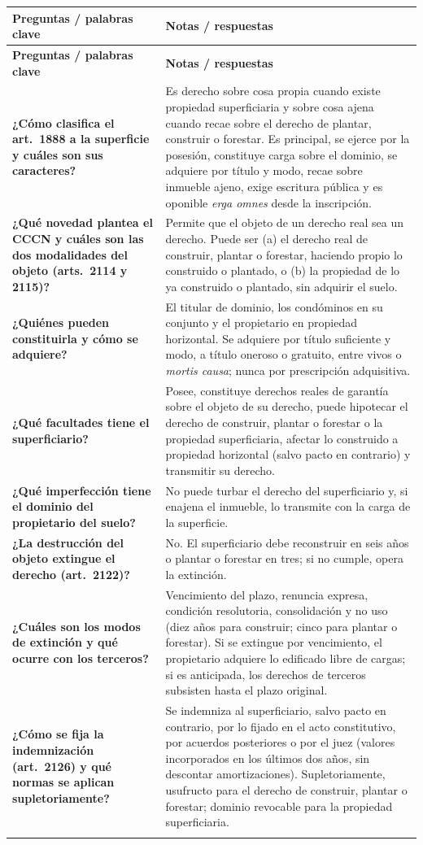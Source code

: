\documentclass[12pt,oneside]{book}
\makeatletter
\renewcommand{\arraystretch}{1.25}
\newcommand{\cq}[2]{\textbf{#1} & #2 \\[0.45em]}
\newcommand{\cornell}[3]{%
\par\bigskip\noindent{\large\bfseries Cuadro Cornell: #1}\par\nopagebreak\smallskip
\begingroup
\small
\renewcommand{\arraystretch}{1.15}
\begin{longtable}{@{}>{\raggedright\arraybackslash}p{0.26\textwidth}>{\raggedright\arraybackslash}p{0.66\textwidth}@{}}
\toprule
\textbf{Preguntas / palabras clave} & \textbf{Notas / respuestas} \\
\midrule
\endfirsthead
\toprule
\textbf{Preguntas / palabras clave} & \textbf{Notas / respuestas} \\
\midrule
\endhead
#2
\midrule
\multicolumn{2}{@{}p{\dimexpr0.92\textwidth+2\tabcolsep\relax}@{}}{\vspace{0.2em}\textbf{Resumen.} #3\vspace{0.2em}} \\
\bottomrule
\end{longtable}
\endgroup
}
\makeatother
\begin{document}
\cornell{superficie}{
\cq{¿Cómo clasifica el art.~1888 a la superficie y cuáles son sus caracteres?}{Es derecho sobre cosa propia cuando existe propiedad superficiaria y sobre cosa ajena cuando recae sobre el derecho de plantar, construir o forestar. Es principal, se ejerce por la posesión, constituye carga sobre el dominio, se adquiere por título y modo, recae sobre inmueble ajeno, exige escritura pública y es oponible \textit{erga omnes} desde la inscripción.}
\cq{¿Qué novedad plantea el CCCN y cuáles son las dos modalidades del objeto (arts.~2114 y 2115)?}{Permite que el objeto de un derecho real sea un derecho. Puede ser (a) el derecho real de construir, plantar o forestar, haciendo propio lo construido o plantado, o (b) la propiedad de lo ya construido o plantado, sin adquirir el suelo.}
\cq{¿Quiénes pueden constituirla y cómo se adquiere?}{El titular de dominio, los condóminos en su conjunto y el propietario en propiedad horizontal. Se adquiere por título suficiente y modo, a título oneroso o gratuito, entre vivos o \textit{mortis causa}; nunca por prescripción adquisitiva.}
\cq{¿Qué facultades tiene el superficiario?}{Posee, constituye derechos reales de garantía sobre el objeto de su derecho, puede hipotecar el derecho de construir, plantar o forestar o la propiedad superficiaria, afectar lo construido a propiedad horizontal (salvo pacto en contrario) y transmitir su derecho.}
\cq{¿Qué imperfección tiene el dominio del propietario del suelo?}{No puede turbar el derecho del superficiario y, si enajena el inmueble, lo transmite con la carga de la superficie.}
\cq{¿La destrucción del objeto extingue el derecho (art.~2122)?}{No. El superficiario debe reconstruir en seis años o plantar o forestar en tres; si no cumple, opera la extinción.}
\cq{¿Cuáles son los modos de extinción y qué ocurre con los terceros?}{Vencimiento del plazo, renuncia expresa, condición resolutoria, consolidación y no uso (diez años para construir; cinco para plantar o forestar). Si se extingue por vencimiento, el propietario adquiere lo edificado libre de cargas; si es anticipada, los derechos de terceros subsisten hasta el plazo original.}
\cq{¿Cómo se fija la indemnización (art.~2126) y qué normas se aplican supletoriamente?}{Se indemniza al superficiario, salvo pacto en contrario, por lo fijado en el acto constitutivo, por acuerdos posteriores o por el juez (valores incorporados en los últimos dos años, sin descontar amortizaciones). Supletoriamente, usufructo para el derecho de construir, plantar o forestar; dominio revocable para la propiedad superficiaria.}
}{La superficie, regulada en los arts.~2114 a 2126, separa la propiedad del suelo de la de lo construido, plantado o forestado. Admite dos modalidades según su objeto y se adquiere por título y modo, nunca por prescripción, con escritura pública e inscripción para su oponibilidad. El superficiario posee, puede gravar y transmitir su derecho; el propietario conserva un dominio imperfecto. Se extingue por vencimiento, renuncia, condición resolutoria, consolidación o no uso; la destrucción del objeto no la extingue de inmediato. Al extinguirse, el propietario adquiere lo edificado o plantado y debe indemnizar al superficiario, salvo pacto en contrario.}
\end{document}
